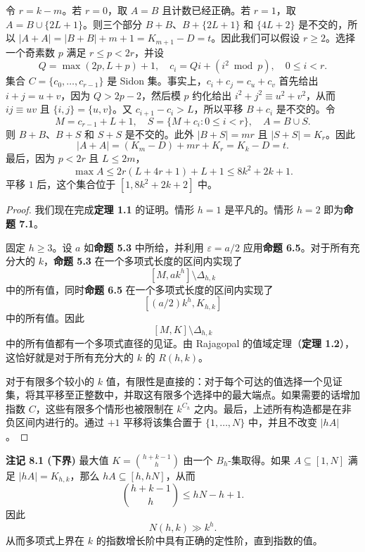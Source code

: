 \documentclass[11pt]{article}
\theoremstyle{break}
\begin{document}
令 $r = k-m$。若 $r = 0$，取 $A = B$ 且计数已经正确。若 $r = 1$，取 $A = B \cup \{2L+1\}$。则三个部分 $B+B$、$B+\{2L+1\}$ 和 $\{4L+2\}$ 是不交的，所以 $|A+A| = |B+B| + m + 1 = K_{m+1} - D = t$。因此我们可以假设 $r \ge 2$。选择一个奇素数 $p$ 满足 $r \le p < 2r$，并设
\[ Q = \max(2p, L+p) + 1, \quad c_i = Qi + (i^2 \bmod p), \quad 0 \le i < r. \]
集合 $C = \{c_0, \dots, c_{r-1}\}$ 是 Sidon 集。事实上，$c_i + c_j = c_u + c_v$ 首先给出 $i+j = u+v$，因为 $Q > 2p-2$，然后模 $p$ 约化给出 $i^2 + j^2 \equiv u^2 + v^2$，从而 $ij \equiv uv$ 且 $\{i, j\} = \{u, v\}$。又 $c_{i+1} - c_i > L$，所以平移 $B+c_i$ 是不交的。令
\[ M = c_{r-1} + L + 1, \quad S = \{M + c_i : 0 \le i < r\}, \quad A = B \cup S. \]
则 $B+B$、$B+S$ 和 $S+S$ 是不交的。此外 $|B+S| = mr$ 且 $|S+S| = K_r$。因此
\[ |A+A| = (K_m - D) + mr + K_r = K_k - D = t. \]
最后，因为 $p < 2r$ 且 $L \le 2m$，
\[ \max A \le 2r(L+4r+1) + L + 1 \le 8k^2 + 2k + 1. \]
平移 $1$ 后，这个集合位于 $[1, 8k^2+2k+2]$ 中。
\begin{proof}
我们现在完成\textbf{定理 1.1} 的证明。情形 $h = 1$ 是平凡的。情形 $h = 2$ 即为\textbf{命题 7.1}。

固定 $h \geq 3$。设 $a$ 如\textbf{命题 5.3} 中所给，并利用 $\varepsilon = a/2$ 应用\textbf{命题 6.5}。对于所有充分大的 $k$，\textbf{命题 5.3} 在一个多项式长度的区间内实现了
\[[M, a k^h] \setminus \Delta_{h,k}\]
中的所有值，同时\textbf{命题 6.5} 在一个多项式长度的区间内实现了
\[[(a/2)k^h, K_{h,k}]\]
中的所有值。因此
\[[M, K] \setminus \Delta_{h,k}\]
中的所有值都有一个多项式直径的见证。由 Rajagopal 的值域定理（\textbf{定理 1.2}），这恰好就是对于所有充分大的 $k$ 的 $R(h,k)$。

对于有限多个较小的 $k$ 值，有限性是直接的：对于每个可达的值选择一个见证集，将其平移至正整数中，并取这有限多个选择中的最大端点。如果需要的话增加指数 $C$，这些有限多个情形也被限制在 $k^{C_h}$ 之内。最后，上述所有构造都是在非负区间内进行的。通过 $+1$ 平移将该集合置于 $\{1,\dots,N\}$ 中，并且不改变 $|hA|$。
\end{proof}
\textbf{注记 8.1 (下界)} 最大值 $K = \binom{h+k-1}{h}$ 由一个 $B_h$-集取得。如果 $A \subseteq [1,N]$ 满足 $|hA| = K_{h,k}$，那么 $hA \subseteq [h, hN]$，从而
\[
\binom{h+k-1}{h} \leq hN - h + 1.
\]
因此
\[
N(h,k) \gg k^h.
\]
从而多项式上界在 $k$ 的指数增长阶中具有正确的定性阶，直到指数的值。
\end{document}
